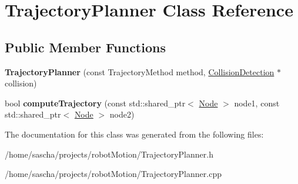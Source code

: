 \hypertarget{class_trajectory_planner}{\section{Trajectory\-Planner Class Reference}
\label{class_trajectory_planner}
}
\subsection*{Public Member Functions}
\begin{DoxyCompactItemize}
\item 
\hypertarget{class_trajectory_planner_a7007b670a2e42154dc39036c042c61f8}{{\bfseries Trajectory\-Planner} (const Trajectory\-Method method, \hyperlink{class_collision_detection}{Collision\-Detection} $\ast$collision)}\label{class_trajectory_planner_a7007b670a2e42154dc39036c042c61f8}

\item 
\hypertarget{class_trajectory_planner_a119dbff9c0d27bd153f7beb76a8f5313}{bool {\bfseries compute\-Trajectory} (const std\-::shared\-\_\-ptr$<$ \hyperlink{class_node}{Node} $>$ node1, const std\-::shared\-\_\-ptr$<$ \hyperlink{class_node}{Node} $>$ node2)}\label{class_trajectory_planner_a119dbff9c0d27bd153f7beb76a8f5313}

\end{DoxyCompactItemize}


The documentation for this class was generated from the following files\-:\begin{DoxyCompactItemize}
\item 
/home/sascha/projects/robot\-Motion/Trajectory\-Planner.\-h\item 
/home/sascha/projects/robot\-Motion/Trajectory\-Planner.\-cpp\end{DoxyCompactItemize}
